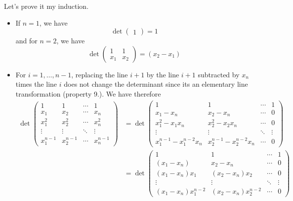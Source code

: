 \begin{solution}
  Let's prove it my induction.
  \begin{itemize}
    \item If $n = 1$, we have
      \[
        \det
        \begin{pmatrix}
          1
        \end{pmatrix}
        = 1
      \]
      and for $n = 2$, we have
      \[
        \det
        \begin{pmatrix}
          1 & 1\\
          x_1 & x_2
        \end{pmatrix}
        = (x_2 - x_1)
      \]
    \item
      For $i = 1, \ldots, n-1$, replacing the line $i+1$
      by the line $i+1$ subtracted by $x_n$ times the line $i$
      does not change the determinant since
      its an elementary line transformation (property 9.).
      We have therefore
      \begin{align*}
        \det
        \begin{pmatrix}
          1 & 1 & \cdots & 1\\
          x_1 & x_2 & \cdots & x_n\\
          x_1^2 & x_2^2 & \cdots & x_n^2\\
          \vdots & \vdots & \ddots & \vdots\\
          x_1^{n-1} & x_2^{n-1} & \cdots & x_n^{n-1}
        \end{pmatrix}
        & =
        \det
        \begin{pmatrix}
          1 & 1 & \cdots & 1\\
          x_1-x_n & x_2-x_n & \cdots & 0\\
          x_1^2-x_1x_n & x_2^2 - x_2x_n & \cdots & 0\\
          \vdots & \vdots & \ddots & \vdots\\
          x_1^{n-1}-x_1^{n-2}x_n & x_2^{n-1}-x_2^{n-2}x_n & \cdots & 0
        \end{pmatrix}\\
        & =
        \det
        \begin{pmatrix}
          1 & 1 & \cdots & 1\\
          (x_1-x_n) & x_2-x_n & \cdots & 0\\
          (x_1-x_n)x_1 & (x_2-x_n)x_2 & \cdots & 0\\
          \vdots & \vdots & \ddots & \vdots\\
          (x_1-x_n)x_1^{n-2} & (x_2-x_n)x_2^{n-2} & \cdots & 0

\end{pmatrix}
\end{align*}
\end{itemize}
\end{solution}
